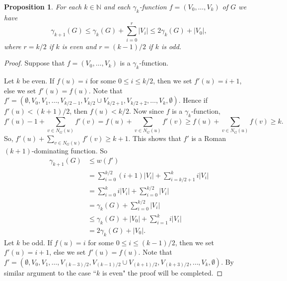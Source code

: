 \documentclass[12pt]{amsart}
\newtheorem{proposition}[theorem]{Proposition}
\begin{document}
\begin{proposition}
For each $k\in \mathbb{N}$ and each $\gamma_k$-function $f=(V_0, \dots , V_k)$ of $G$ we have 
$$\gamma_{k+1}(G)\leq \gamma_k(G)+\sum_{i=0}^r|V_i|\leq 2\gamma_k(G)+|V_0|,$$
where $r=k/2$ if $k$ is even and $r=(k-1)/2$ if $k$ is odd.
\end{proposition}
\begin{proof}
Suppose that  $f=(V_0, \dots , V_k)$ is a $\gamma_k$-function. 

Let $k$ be even. If $f(u)=i$ for some $0\leq i \leq k/2$, then we set $f'(u)=i+1$, else we set $f'(u)=f(u)$. Note that $f'=(\emptyset, V_0, V_1, \dots, V_{k/2-1}, V_{k/2}\cup V_{k/2+1}, V_{k/2+2}, \dots, V_k, \emptyset )$. Hence if $f'(u)<(k+1)/2$, then $f(u)<k/2$. Now since $f$ is a $\gamma_k$-function, 
$$f'(u)-1+\sum_{v\in N_G(u)}f'(v)=f(u)+\sum_{v\in N_G(u)}f'(v)\geq f(u)+\sum_{v\in N_G(u)}f(v)\geq k.$$
So, $f'(u)+\sum_{v\in N_G(u)}f'(v)\geq k+1$. This shows that $f'$ is a Roman $(k+1)$-dominating function. So
\begin{align*}
\gamma_{k+1}(G)&\leq w(f')\\
&=\sum_{i=0}^{k/2}(i+1)|V_i|+\sum_{i=k/2+1}^ki|V_i|\\
&=\sum_{i=0}^k i|V_i|+\sum_{i=0}^{k/2}|V_i|\\
&=\gamma_k(G)+\sum_{i=0}^{k/2}|V_i|\\
&\leq \gamma_k(G)+|V_0|+\sum_{i=1}^ki|V_i|\\
&=2\gamma_k(G)+|V_0|.
\end{align*}
Let $k$ be odd. If $f(u)=i$ for some $0\leq i \leq (k-1)/2$, then we set $f'(u)=i+1$, else we set $f'(u)=f(u)$. Note that $f'=(\emptyset, V_0, V_1, \dots, V_{(k-3)/2}, V_{(k-1)/2}\cup V_{(k+1)/2}, V_{(k+3)/2}, \dots, V_k, \emptyset )$. By similar argument to the case ``$k$ is even" the proof will be completed.
\end{proof}
\end{document}
